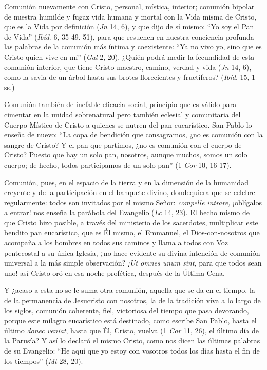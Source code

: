 			\begin{body}Comunión nuevamente con Cristo, personal, mística, interior; comunión bipolar de nuestra humilde y fugaz vida humana y mortal con la Vida misma de Cristo, que es la Vida por definición (\textit{Jn} 14, 6), y que dijo de sí mismo: “Yo soy el Pan de Vida” (\textit{Ibíd}. 6, 35-49. 51), para que resuenen en nuestra conciencia profunda las palabras de la comunión más íntima y coexistente: “Ya no vivo yo, sino que es Cristo quien vive en mí” (\textit{Gal} 2, 20). ¿Quién podrá medir la fecundidad de esta comunión interior, que tiene Cristo maestro, camino, verdad y vida (\textit{Jn} 14, 6), como la savia de un árbol hasta sus brotes florecientes y fructíferos? (\textit{Ibíd}. 15, 1 ss.)\end{body}
			
			\begin{body}Comunión también de inefable eficacia social, principio que es válido para cimentar en la unidad sobrenatural pero también eclesial y comunitaria del Cuerpo Místico de Cristo a quienes se nutren del pan eucarístico. San Pablo lo enseña de nuevo: “La copa de bendición que consagramos, ¿no es comunión con la sangre de Cristo? Y el pan que partimos, ¿no es comunión con el cuerpo de Cristo? Puesto que hay un solo pan, nosotros, aunque muchos, somos un solo cuerpo; de hecho, todos participamos de un solo pan” (1 \textit{Cor} 10, 16-17). \end{body}
			
			\begin{body}Comunión, pues, en el espacio de la tierra y en la dimensión de la humanidad creyente y de la participación en el banquete divino, dondequiera que se celebre regularmente: todos son invitados por el mismo Señor: \textit{compelle intrare,} ¡oblígalos a entrar! nos enseña la parábola del Evangelio (\textit{Lc} 14, 23). El hecho mismo de que Cristo hizo posible, a través del ministerio de los sacerdotes, multiplicar este bendito pan eucarístico, que es Él mismo, el Emmanuel, el Dios-con-nosotros que acompaña a los hombres en todos sus caminos y llama a todos con Voz pentecostal a su única Iglesia, ¿no hace evidente su divina intención de comunión universal a la más simple observación? \textit{¡Ut omnes unum sint}, para que todos sean uno! así Cristo oró en esa noche profética, después de la Última Cena.\end{body}
			
			\begin{body}Y ¿acaso a esta no se le suma otra comunión, aquella que se da en el tiempo, la de la permanencia de Jesucristo con nosotros, la de la tradición viva a lo largo de los siglos, comunión coherente, fiel, victoriosa del tiempo que pasa devorando, porque este milagro eucarístico está destinado, como escribe San Pablo, hasta el último \textit{donec veniat}, hasta que Él, Cristo, vuelva (1 \textit{Cor }11, 26), el último día de la Parusía? Y así lo declaró el mismo Cristo, como nos dicen las últimas palabras de su Evangelio: “He aquí que yo estoy con vosotros todos los días hasta el fin de los tiempos” (\textit{Mt} 28, 20). \end{body}
			
